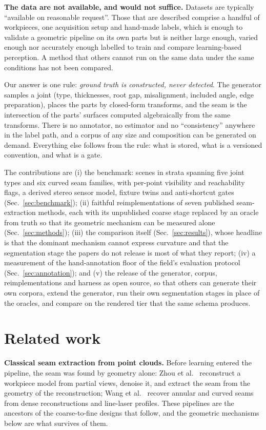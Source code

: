 \documentclass[letterpaper, 10 pt, conference]{ieeeconf}
\begin{document}
\textbf{The data are not available, and would not suffice.} Datasets are typically ``available on reasonable request''. Those that are described comprise a handful of workpieces, one acquisition setup and hand-made labels, which is enough to validate a geometric pipeline on its own parts but is neither large enough, varied enough nor accurately enough labelled to train and compare learning-based perception. A method that others cannot run on the same data under the same conditions has not been compared.

Our answer is one rule: \emph{ground truth is constructed, never detected}. The generator samples a joint (type, thicknesses, root gap, misalignment, included angle, edge preparation), places the parts by closed-form transforms, and the seam is the intersection of the parts' surfaces computed algebraically from the same transforms. There is no annotator, no estimator and no ``consistency'' anywhere in the label path, and a corpus of any size and composition can be generated on demand. Everything else follows from the rule: what is stored, what is a versioned convention, and what is a gate.

The contributions are (i) the benchmark: \nScenes{} scenes in \nStrata{} strata spanning five joint types and six curved seam families, with per-point visibility and reachability flags, a derived stereo sensor model, fixture twins and anti-shortcut gates (Sec.~\ref{sec:benchmark}); (ii) faithful reimplementations of seven published seam-extraction methods, each with its unpublished coarse stage replaced by an oracle from truth so that its geometric mechanism can be measured alone (Sec.~\ref{sec:methods}); (iii) the comparison itself (Sec.~\ref{sec:results}), whose headline is that the dominant mechanism cannot express curvature and that the segmentation stage the papers do not release is most of what they report; (iv) a measurement of the hand-annotation floor of the field's evaluation protocol (Sec.~\ref{sec:annotation}); and (v) the release of the generator, corpus, reimplementations and harness as open source, so that others can generate their own corpora, extend the generator, run their own segmentation stages in place of the oracles, and compare on the rendered tier that the same schema produces.

\section{Related work}\label{sec:related}

\textbf{Classical seam extraction from point clouds.} Before learning entered the pipeline, the seam was found by geometry alone: Zhou et al.~\cite{zhou2020pathplanning} reconstruct a workpiece model from partial views, denoise it, and extract the seam from the geometry of the reconstruction; Wang et al.~\cite{wang2023tubesheet,wang2025laser} recover annular and curved seams from dense reconstructions and line-laser profiles. These pipelines are the ancestors of the coarse-to-fine designs that follow, and the geometric mechanisms below are what survives of them.
\end{document}
